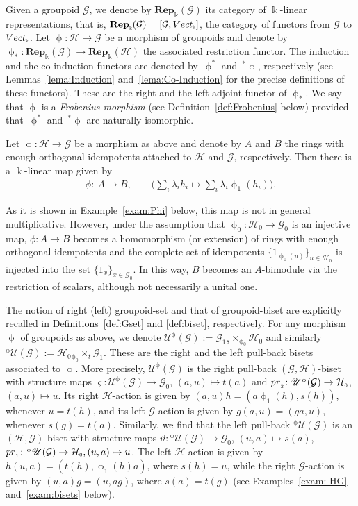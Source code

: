 \documentclass[11pt]{article}
\numberwithin{equation}{section}
\newcommand{\Rep}[1]{\mathbf{Rep}_{\Sscript{\Bbbk}}(#1)}
\newcommand{\Vect}{{\rm Vect}_{\Sscript{\Bbbk}}}
\newcommand{\Go}{\cG_{\Sscript{0}}}
\newcommand{\Ga}{\cG_{\Sscript{1}}}
\newcommand{\Ho}{\cH_{\Sscript{0}}}
\newcommand{\uU}{\mathscr{U}}
\newcommand{\cG}{{\mathcal G}}
\newcommand{\cH}{{\mathcal H}}
\newcommand{\Sscript}[1]{\scriptscriptstyle{#1}}
\newcommand{\due}[3]{{}_{{#2 }} {#1}_{{ #3}} }
\newcommand{\upg}{\uU^{\Sscript{\upphi}}(\cG)}
\newcommand{\pug}{{}^{\Sscript{\upphi}}\uU(\cG)}
\newcommand{\phio}{\upphi_{\Sscript{0}}}
\newcommand{\phia}{\upphi_{\Sscript{1}}}
\begin{document}
Given a groupoid $\cG$, we denote by $\Rep{\cG}$ its category of $\Bbbk$-linear representations, that is, $\Rep{\cG}=[\cG, \Vect]$, the category of functors from $\cG$ to $\Vect$. Let $\upphi \colon \cH \to \cG$ be a morphism of groupoids and denote by $\upphi_{\Sscript{*}}\colon \Rep{\cG} \to \Rep{\cH}$ the associated restriction functor. The induction and the co-induction functors are denoted by~$\upphi^{*}$ and~${}^{*}\upphi$, respectively (see Lemmas~\ref{lema:Induction} and~\ref{lema:Co-Induction} for the precise definitions of these functors). These are the right and the left adjoint functor of $\upphi_{\Sscript{*}}$. We say that $\upphi$ is a \emph{Frobenius morphism} (see Definition~\ref{def:Frobenius} below) provided that~$\upphi^{*}$ and~${}^{*}\upphi$ are naturally isomorphic.

 Let $\upphi\colon \cH \to \cG$ be a morphism as above and denote by $A$ and $B$ the rings with enough orthogonal idempotents attached to $\cH$ and $\cG$, respectively. Then there is a $\Bbbk$-linear map given by
\begin{gather}\label{Eq:phi}
\phi\colon \ A \longrightarrow B, \qquad \bigg( \sum_i \lambda_i h_i \longmapsto \sum_i \lambda_i \phia(h_i)\bigg).
\end{gather}

As it is shown in Example~\ref{exam:Phi} below, this map is not in general multiplicative. However, under the assumption that $\phio\colon \Ho \to \Go$ is an injective map, $\phi\colon A \to B$ becomes a homomorphism (or extension) of rings with enough orthogonal idempotents and the complete set of idempotents $\{1_{\Sscript{\phio(u)}}\}_{u \in \Ho}$ is injected into the set $\{1_{\Sscript{x}}\}_{x \in \Go}$. In this way, $B$ becomes an $A$-bimodule via the restriction of scalars, although not necessarily a unital one.

The notion of right (left) groupoid-set and that of groupoid-biset are explicitly recalled in Definitions~\ref{def:Gset} and \ref{def:biset}, respectively. For any morphism $\upphi$ of groupoids as above, we denote $\upg:=\Ga \due \times {\Sscript{s}}{ \Sscript{\upphi_0} } \Ho$ and similarly ${ }^{\Sscript{\upphi}}\uU(\cG):=\Ho \due \times{\Sscript{\upphi_0}}{ \Sscript{t}} \Ga$. These are the right and the left pull-back bisets associated to $\upphi$. More precisely, $\upg$ is the right pull-back $(\cG,\cH)$-biset with structure maps $\varsigma\colon \upg \to \Go$, $(a,u) \mapsto t(a)$ and ${\rm pr}_{\Sscript{2}}\colon \upg \to \Ho$, $(a,u) \mapsto u$. Its right $\cH$-action is given by $(a,u) h= (a\phia(h), s(h))$, whenever $u=t(h)$, and its left $\cG$-action is given by $g(a,u)=(ga,u)$, whenever $s(g)=t(a)$. Similarly, we find that the left pull-back ${ }^{\Sscript{\upphi}}\uU(\cG)$ is an $(\cH,\cG)$-biset with structure maps $\vartheta\colon {}^{\Sscript{\upphi}}\uU(\cG) \to \Go$, $(u,a) \mapsto s(a)$, ${\rm pr}_{\Sscript{1}}\colon \pug \to \Ho, (u,a) \mapsto u$. The left $\cH$-action is given by $h (u,a)=(t(h), \phia(h)a)$, where $s(h)=u$, while the right $\cG$-action is given by $(u,a) g=(u,ag)$, where $s(a)=t(g)$ (see Examples~\ref{exam: HG} and~\ref{exam:bisets} below).
\end{document}
